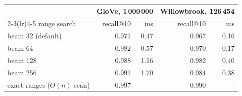 \begin{tabular}{l rr rr}
\toprule
 & \multicolumn{2}{c}{GloVe, 1\,000\,000} & \multicolumn{2}{c}{Willowbrook, 126\,454}\\
\cmidrule(lr){2-3}\cmidrule(lr){4-5}
range search & recall@10 & ms & recall@10 & ms\\
\midrule
beam 32 (default) & 0.971 & 0.47 & 0.967 & 0.16\\
beam 64 & 0.982 & 0.57 & 0.970 & 0.17\\
beam 128 & 0.988 & 1.16 & 0.982 & 0.40\\
beam 256 & 0.991 & 1.70 & 0.984 & 0.38\\
exact ranges ($O(n)$ scan) & 0.997 & -- & 0.990 & --\\
\bottomrule
\end{tabular}
